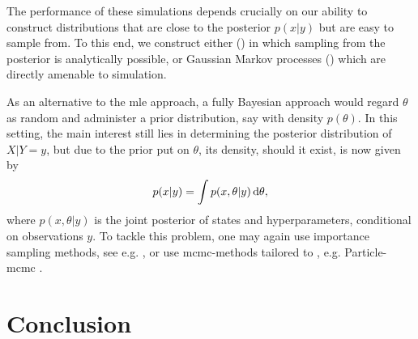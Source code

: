 The performance of these simulations depends crucially on our ability to construct distributions that are close to the posterior $p(x|y)$ but are easy to sample from. To this end, we construct either  () in which sampling from the posterior is analytically possible, or Gaussian Markov processes () which are directly amenable to simulation.

As an alternative to the \acrshort{mle} approach, a fully Bayesian approach would regard $\theta$ as random and administer a prior distribution, say with density $p(\theta)$. In this setting, the main interest still lies in determining the posterior distribution of $X|Y=y$, but due to the prior put on $\theta$, its density, should it exist, is now given by
$$
p(x|y) = \int p(x,\theta|y) \,\mathrm d \theta,
$$
where $p(x,\theta|y)$ is the joint posterior of states and hyperparameters, conditional on observations $y$. To tackle this problem, one may again use importance sampling methods, see e.g. \citep[Chapter 13.1]{Durbin2012Time}, or use \acrshort{mcmc}-methods tailored to , e.g. Particle-\acrshort{mcmc} \citep[Chapter 16]{Chopin2020Introduction}.







%



\section{Conclusion}
\label{sec:03_conclusion}

